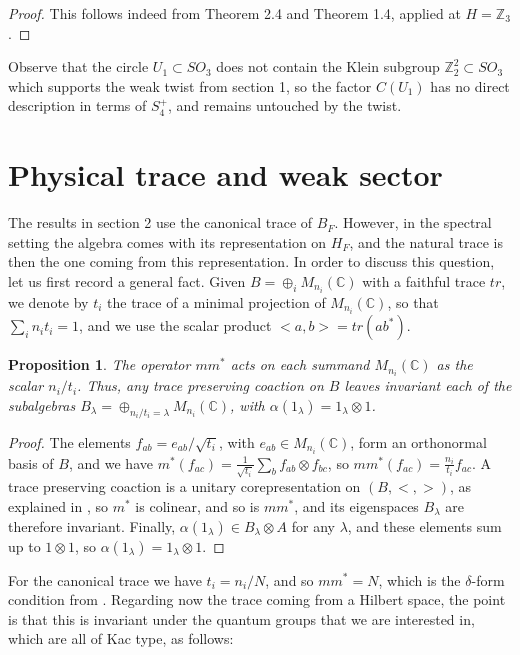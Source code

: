 \documentclass[11pt]{amsart}
\newtheorem{proposition}[theorem]{Proposition}
\theoremstyle{definition}
\begin{document}
\begin{proof}
This follows indeed from Theorem 2.4 and Theorem 1.4, applied at $H=\mathbb Z_3$.
\end{proof}

Observe that the circle $U_1\subset SO_3$ does not contain the Klein subgroup $\mathbb Z_2^2\subset SO_3$ which supports the weak twist from section 1, so the factor $C(U_1)$ has no direct description in terms of $S_4^+$, and remains untouched by the twist.

\section{Physical trace and weak sector}

The results in section 2 use the canonical trace of $B_F$. However, in the spectral setting the algebra comes with its representation on $H_F$, and the natural trace is then the one coming from this representation. In order to discuss this question, let us first record a general fact. Given $B=\oplus_iM_{n_i}(\mathbb C)$ with a faithful trace $tr$, we denote by $t_i$ the trace of a minimal projection of $M_{n_i}(\mathbb C)$, so that $\sum_in_it_i=1$, and we use the scalar product $<a,b>=tr(ab^*)$.

\begin{proposition}
The operator $mm^*$ acts on each summand $M_{n_i}(\mathbb C)$ as the scalar $n_i/t_i$. Thus, any trace preserving coaction on $B$ leaves invariant each of the subalgebras $B_\lambda=\oplus_{n_i/t_i=\lambda}M_{n_i}(\mathbb C)$, with $\alpha(1_\lambda)=1_\lambda\otimes1$.
\end{proposition}

\begin{proof}
The elements $f_{ab}=e_{ab}/\sqrt{t_i}$, with $e_{ab}\in M_{n_i}(\mathbb C)$, form an orthonormal basis of $B$, and we have $m^*(f_{ac})=\frac{1}{\sqrt{t_i}}\sum_bf_{ab}\otimes f_{bc}$, so $mm^*(f_{ac})=\frac{n_i}{t_i}f_{ac}$. A trace preserving coaction is a unitary corepresentation on $(B,<,>)$, as explained in \cite{ban}, so $m^*$ is colinear, and so is $mm^*$, and its eigenspaces $B_\lambda$ are therefore invariant. Finally, $\alpha(1_\lambda)\in B_\lambda\otimes A$ for any $\lambda$, and these elements sum up to $1\otimes1$, so $\alpha(1_\lambda)=1_\lambda\otimes1$.
\end{proof}

For the canonical trace we have $t_i=n_i/N$, and so $mm^*=N$, which is the $\delta$-form condition from \cite{ban}. Regarding now the trace coming from a Hilbert space, the point is that this is invariant under the quantum groups that we are interested in, which are all of Kac type, as follows:
\end{document}
